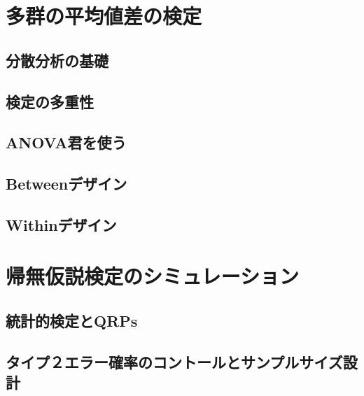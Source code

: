 \documentclass[
  a4paper,
]{ltjsbook}
\begin{document}

\chapter{多群の平均値差の検定}\label{ux591aux7fa4ux306eux5e73ux5747ux5024ux5deeux306eux691cux5b9a}

\section{分散分析の基礎}\label{ux5206ux6563ux5206ux6790ux306eux57faux790e}

\section{検定の多重性}\label{ux691cux5b9aux306eux591aux91cdux6027}

\section{ANOVA君を使う}\label{anovaux541bux3092ux4f7fux3046}

\section{Betweenデザイン}\label{betweenux30c7ux30b6ux30a4ux30f3}

\section{Withinデザイン}\label{withinux30c7ux30b6ux30a4ux30f3}


\chapter{帰無仮説検定のシミュレーション}\label{ux5e30ux7121ux4eeeux8aacux691cux5b9aux306eux30b7ux30dfux30e5ux30ecux30fcux30b7ux30e7ux30f3}

\section{統計的検定とQRPs}\label{ux7d71ux8a08ux7684ux691cux5b9aux3068qrps}

\section{タイプ２エラー確率のコントールとサンプルサイズ設計}\label{ux30bfux30a4ux30d7uxff12ux30a8ux30e9ux30fcux78baux7387ux306eux30b3ux30f3ux30c8ux30fcux30ebux3068ux30b5ux30f3ux30d7ux30ebux30b5ux30a4ux30baux8a2dux8a08}
\end{document}
